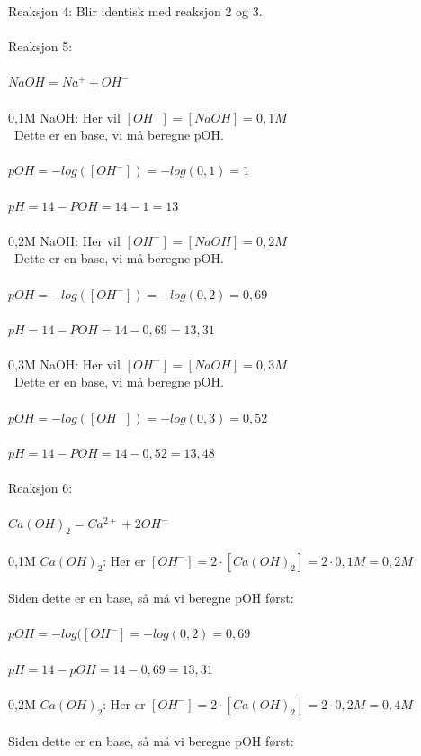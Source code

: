 \documentclass{minmal}
\begin{document}
\noindent Reaksjon 4: Blir identisk med reaksjon 2 og 3.\\\\
\noindent Reaksjon 5:\\\\
$NaOH=Na^++OH^-$\\\\
0,1M NaOH: Her vil $[OH^-]=[NaOH]=0,1M$\\\
Dette er en base, vi må beregne pOH.\\\\
$pOH=-log([OH^-])=-log(0,1)=1$\\\\
$pH=14-POH=14-1=13$\\\\
0,2M NaOH: Her vil $[OH^-]=[NaOH]=0,2M$\\\
Dette er en base, vi må beregne pOH.\\\\
$pOH=-log([OH^-])=-log(0,2)=0,69$\\\\
$pH=14-POH=14-0,69=13,31$\\\\
0,3M NaOH: Her vil $[OH^-]=[NaOH]=0,3M$\\\
Dette er en base, vi må beregne pOH.\\\\
$pOH=-log([OH^-])=-log(0,3)=0,52$\\\\
$pH=14-POH=14-0,52=13,48$\\\\
\noindent Reaksjon 6:\\\\
$Ca(OH)_2=Ca^{2+}+2OH^-$\\\\
0,1M $Ca(OH)_2$: Her er $[OH^-]=2\cdot[Ca(OH)_2]=2\cdot 0,1M=0,2M$\\\\
Siden dette er en base, så må vi beregne pOH først:\\\\
$pOH=-log([OH^-]=-log(0,2)=0,69$\\\\
$pH=14-pOH=14-0,69=13,31$\\\\
0,2M $Ca(OH)_2$: Her er $[OH^-]=2\cdot[Ca(OH)_2]=2\cdot 0,2M=0,4M$\\\\
Siden dette er en base, så må vi beregne pOH først:\\\\
\end{document}
